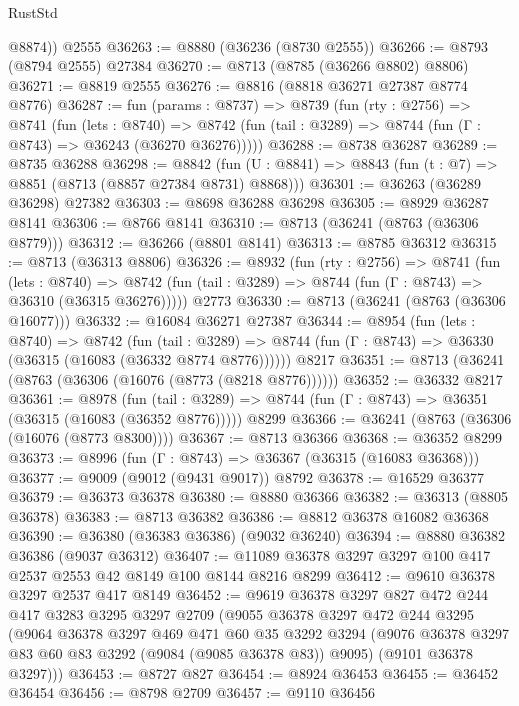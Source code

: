 \begin{lexlean}{RustStd}
\begin{coremodule}
        @8874))
    @2555
@36263 := @8880 (@36236 (@8730 @2555))
@36266 := @8793 (@8794 @2555) @27384
@36270 := @8713 (@8785 (@36266 @8802) @8806)
@36271 := @8819 @2555
@36276 := @8816 (@8818 @36271 @27387 @8774 @8776)
@36287 := fun (params : @8737) =>
  @8739
    (fun (rty : @2756) =>
    @8741
      (fun (lets : @8740) =>
      @8742 (fun (tail : @3289) => @8744 (fun (Γ : @8743) => @36243 (@36270 @36276)))))
@36288 := @8738 @36287
@36289 := @8735 @36288
@36298 := @8842
    (fun (U : @8841) => @8843 (fun (t : @7) => @8851 (@8713 (@8857 @27384 @8731) @8868)))
@36301 := @36263 (@36289 @36298) @27382
@36303 := @8698 @36288 @36298
@36305 := @8929 @36287 @8141
@36306 := @8766 @8141
@36310 := @8713 (@36241 (@8763 (@36306 @8779)))
@36312 := @36266 (@8801 @8141)
@36313 := @8785 @36312
@36315 := @8713 (@36313 @8806)
@36326 := @8932
    (fun (rty : @2756) =>
    @8741
      (fun (lets : @8740) =>
      @8742 (fun (tail : @3289) => @8744 (fun (Γ : @8743) => @36310 (@36315 @36276)))))
    @2773
@36330 := @8713 (@36241 (@8763 (@36306 @16077)))
@36332 := @16084 @36271 @27387
@36344 := @8954
    (fun (lets : @8740) =>
    @8742
      (fun (tail : @3289) =>
      @8744 (fun (Γ : @8743) => @36330 (@36315 (@16083 (@36332 @8774 @8776))))))
    @8217
@36351 := @8713 (@36241 (@8763 (@36306 (@16076 (@8773 (@8218 @8776))))))
@36352 := @36332 @8217
@36361 := @8978
    (fun (tail : @3289) => @8744 (fun (Γ : @8743) => @36351 (@36315 (@16083 (@36352 @8776)))))
    @8299
@36366 := @36241 (@8763 (@36306 (@16076 (@8773 @8300))))
@36367 := @8713 @36366
@36368 := @36352 @8299
@36373 := @8996 (fun (Γ : @8743) => @36367 (@36315 (@16083 @36368)))
@36377 := @9009 (@9012 (@9431 @9017)) @8792
@36378 := @16529 @36377
@36379 := @36373 @36378
@36380 := @8880 @36366
@36382 := @36313 (@8805 @36378)
@36383 := @8713 @36382
@36386 := @8812 @36378 @16082 @36368
@36390 := @36380 (@36383 @36386) (@9032 @36240)
@36394 := @8880 @36382 @36386 (@9037 @36312)
@36407 := @11089 @36378 @3297 @3297 @100 @417 @2537 @2553 @42 @8149 @100 @8144 @8216 @8299
@36412 := @9610 @36378 @3297 @2537 @417 @8149
@36452 := @9619
    @36378
    @3297
    @827
    @472
    @244
    @417
    @3283
    @3295
    @3297
    @2709
    (@9055
      @36378
      @3297
      @472
      @244
      @3295
      (@9064
        @36378
        @3297
        @469
        @471
        @60
        @35
        @3292
        @3294
        (@9076 @36378 @3297 @83 @60 @83 @3292 (@9084 (@9085 @36378 @83)) @9095)
        (@9101 @36378 @3297)))
@36453 := @8727 @827
@36454 := @8924 @36453
@36455 := @36452 @36454
@36456 := @8798 @2709
@36457 := @9110 @36456

\end{coremodule}
\end{lexlean}
